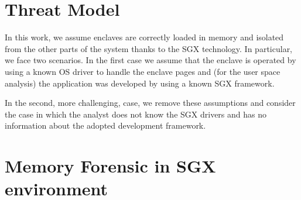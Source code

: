 \section{Threat Model}
\label{sec:system-assumptions}

In this work, we assume enclaves are correctly loaded in memory and
isolated from the other parts of the system thanks to the SGX technology.
In particular, we face two scenarios.
In the first case we assume that the enclave is operated by using a known
OS driver to handle the enclave pages and (for the user space analysis) the
application was developed by using a known SGX framework. 

In the second, more challenging, case, we remove these assumptions and consider
the case in which the analyst does not know the SGX drivers 
and has no information about the adopted development framework.

\section{Memory Forensic in SGX environment}
\label{sec:memory-forensic-sgx}



